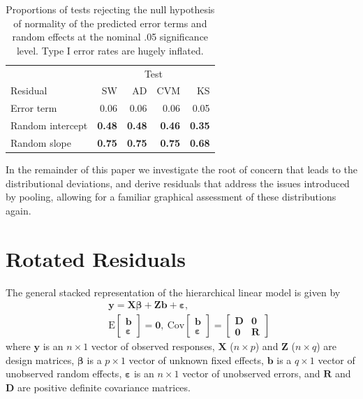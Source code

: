 \documentclass{article} %
\newcommand{\E}{\ensuremath{\mathrm{E}}}
\newcommand{\cov}{\ensuremath{\mathrm{Cov}}}
\begin{document}
%
\begin{table}[htb]
\caption{\label{tab:edf} Proportions of tests rejecting the null hypothesis of normality of the predicted error terms and random effects at the nominal .05 significance level. Type I error rates are hugely inflated. \vspace{.5em}
}
\begin{center}
\begin{tabular}{l rrrr} \hline
& \multicolumn{4}{c}{Test} \\ \cline{2-5}
 Residual & SW &  AD & CVM & KS \\ \hline
Error term			& 0.06 & 0.06 & 0.06 & 0.05\\
Random intercept 	& \bf 0.48 & \bf 0.48 & \bf 0.46 & \bf 0.35\\
Random slope 		& \bf 0.75 & \bf 0.75 & \bf 0.75 & \bf 0.68\\
   \hline
\end{tabular}
\end{center}
\end{table}

In the remainder of this paper we investigate the root of concern that leads to the distributional deviations, and derive residuals that address the issues introduced by pooling, allowing for a familiar graphical assessment of these distributions again.

\section{Rotated Residuals}\label{sec:resid}
The general stacked representation of the hierarchical linear model is given by
%
\begin{eqnarray}\label{eq:hlm}
 && \bm{y} = \bm{X \beta} + \bm{Z b} + \bm{\varepsilon}, \\ \nonumber
 && \E \begin{bmatrix} \bm{b} \\ \bm{\varepsilon} \end{bmatrix} = \bm{0}, 
 \ \cov \begin{bmatrix} \bm{b} \\ \bm{\varepsilon} \end{bmatrix} = 
  	\begin{bmatrix} \bm{D} & \bm{0}\\ \bm{0} & \bm{R} \end{bmatrix}
\end{eqnarray}
%
where $\bm{y}$ is an $n \times 1$ vector of observed responses, $\bm{X}$ ($n \times p$) and $\bm{Z}$ ($n \times q$) are design matrices, $\bm{\beta}$ is a $p \times 1$ vector of unknown fixed effects, $\bm{b}$ is a $q \times 1$ vector of unobserved random effects, $\bm{\varepsilon}$ is an $n \times 1$ vector of unobserved errors, and $\bm{R}$ and $\bm{D}$ are positive definite covariance matrices.
\end{document}
